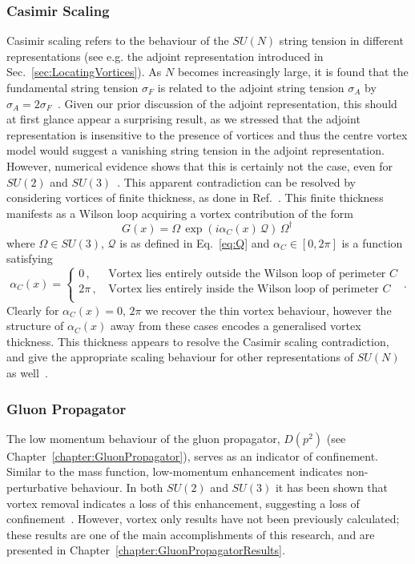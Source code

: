 \subsubsection{Casimir Scaling}
Casimir scaling refers to the behaviour of the $SU(N)$ string tension in different representations (see e.g. the adjoint representation introduced in Sec.~\ref{sec:LocatingVortices}). As $N$ becomes increasingly large, it is found that the fundamental string tension $\sigma_F$ is related to the adjoint string tension $\sigma_A$ by $\sigma_A = 2\sigma_F$~\cite{Greensite:1982be}. Given our prior discussion of the adjoint representation, this should at first glance appear a surprising result, as we stressed that the adjoint representation is insensitive to the presence of vortices and thus the centre vortex model would suggest a vanishing string tension in the adjoint representation. However, numerical evidence shows that this is certainly not the case, even for $SU(2)$ and $SU(3)$~\cite{Ambjorn:1984mb,Ambjorn:1984dp,Campbell:1985kp}. This apparent contradiction can be resolved by considering vortices of finite thickness, as done in Ref.~\cite{Faber:1997rp}. This finite thickness manifests as a Wilson loop acquiring a vortex contribution of the form
%
\begin{equation}
G(x) = \Omega\,\exp\left(i \alpha_C(x)\,\mathcal{Q}\right)\, \Omega^\dagger\,
\end{equation}
%
where $\Omega\in SU(3)$, $\mathcal{Q}$ is as defined in Eq.~\ref{eq:Q} and $\alpha_C\in [0,2\pi]$ is a function satisfying
%
\begin{equation}
\alpha_C(x)=
\begin{cases}
0\, , &\, \text{Vortex lies entirely outside the Wilson loop of perimeter $C$}\\
2\pi\, , &\, \text{Vortex lies entirely inside the Wilson loop of perimeter $C$}\\
\end{cases}\, .
\end{equation}
%
Clearly for $\alpha_C(x) = 0,\,2\pi$ we recover the thin vortex behaviour, however the structure of $\alpha_C(x)$ away from these cases encodes a generalised vortex thickness. This thickness appears to resolve the Casimir scaling contradiction, and give the appropriate scaling behaviour for other representations of $SU(N)$ as well~\cite{Faber:1997rp}.

\subsubsection{Gluon Propagator}
The low momentum behaviour of the gluon propagator, $D(p^2)$ (see Chapter~\ref{chapter:GluonPropagator}), serves as an indicator of confinement. Similar to the mass function, low-momentum enhancement indicates non-perturbative behaviour. In both $SU(2)$ and $SU(3)$ it has been shown that vortex removal indicates a loss of this enhancement, suggesting a loss of confinement~\cite{Bowman:2010zr,Langfeld:2001cz,Quandt:2010yq}. However, vortex only results have not been previously calculated; these results are one of the main accomplishments of this research, and are presented in Chapter~\ref{chapter:GluonPropagatorResults}.

